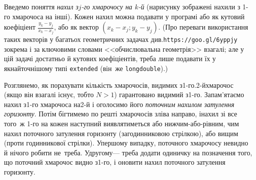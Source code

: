 \documentclass[14pt,a4paper]{extarticle}
\begin{document}
\Tutorial	{}
Введемо поняття \emph{нахил з\nolinebreak[3] \mbox{$j$-го} хмарочосу на \mbox{$k$-й}} (на\nolinebreak[2] рисунку зображені нахили з \mbox{1-го} хмарочоса на інші). Кожен нахил можна подавати у програмі або як кутовий коефіціент 
$\displaystyle\frac{y_k-y_j}{x_k-x_j}$,
або як вектор $({x_k{-}x_j}; {y_k{-}y_j})$.
(Про переваги використання таких векторів у багатьох геометричних задачах
див.\nolinebreak[1] \verb"https://goo.gl/6yppjy" зокрема і за ключовими словами <<обчислювальна геометрія>> взагалі; але у цій задачі достатньо й кутових коефіціентів, треба лише подавати їх у якнайточнішому типі \verb"extended" (він~же \texttt{long\nolinebreak[3] double}).)

Розглянемо, як порахувати кількість хмарочосів, видимих з\nolinebreak[3] \mbox{1-го}.\linebreak[2] \mbox{2-й}\nolinebreak[3] хмарочос (якщо він взагалі існує, тобто ${N{>}1}$) гарантовано видимий з\nolinebreak[3] \mbox{1-го}. Запам’ятаємо нахил з\nolinebreak[3] \mbox{1-го} хмарочоса на\nolinebreak[3] \mbox{2-й} і оголосимо його \emph{поточним нахилом затулення горизонту}. Потім бігтимемо по решті хмарочосів зліва направо, і\nolinebreak[3] нахил зі все того~ж \mbox{1-го} на кожен наступний виявлятиметься або нижчим-або-рівним, чим нахил поточного затулення горизонту (за\nolinebreak[3] годинниковою стрілкою), або вищим (проти годинникової стрілки). У\nolinebreak[3] першому випадку, поточного хмарочосу не\nolinebreak[3] видно й нічого робити не~треба. У\nolinebreak[3] другому\nolinebreak[3] --- треба додати одиничку на позначення того, що поточний хмарочос видно з\nolinebreak[3] \mbox{1-го}, і оновити нахил поточного затулення горизонту.
\end{document}
